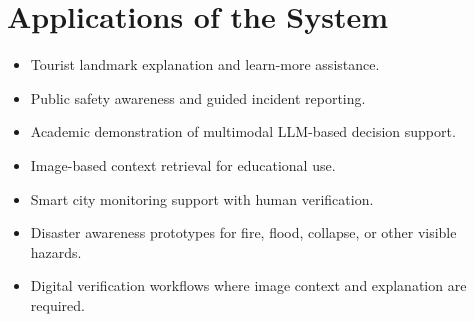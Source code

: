 \section{Applications of the System}
\begin{itemize}
\item Tourist landmark explanation and learn-more assistance.
\item Public safety awareness and guided incident reporting.
\item Academic demonstration of multimodal LLM-based decision support.
\item Image-based context retrieval for educational use.
\item Smart city monitoring support with human verification.
\item Disaster awareness prototypes for fire, flood, collapse, or other visible hazards.
\item Digital verification workflows where image context and explanation are required.
\end{itemize}
